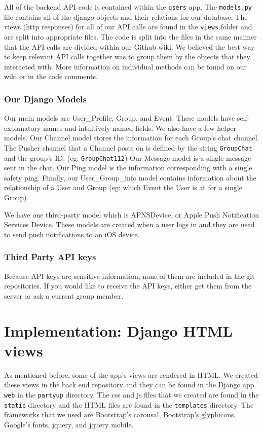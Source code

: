 \documentclass[12pt]{article}
\begin{document}
All of the backend API code is contained within the \texttt{users} app.
The \texttt{models.py} file contains all of the django objects and their relations for our database. 
The views (http responses) for all of our API calls are found in the \texttt{views} folder and are split into appropriate files.
The code is split into the files in the same manner that the API calls are divided within our Github wiki. 
We believed the best way to keep relevant API calls together was to group them by the objects that they interacted with. 
More information on individual methods can be found on our wiki or in the code comments.

\subsubsection{Our Django Models}

Our main models are User\_Profile, Group, and Event. 
These models have self-explanatory names and intuitively named fields. 
We also have a few helper models. 
Our Channel model stores the information for each Group's chat channel. 
The Pusher channel that a Channel posts on is defined by the string \texttt{GroupChat} and the group's ID. (eg: \texttt{GroupChat112}) 
Our Message model is a single message sent in the chat. 
Our Ping model is the information corresponding with a single safety ping. 
Finally, our User\_Group\_info model contains information about the relationship of a User and Group (eg: which Event the User is at for a single Group).

We have one third-party model which is APNSDevice, or Apple Push Notification Services Device. 
These models are created when a user logs in and they are used to send push notifications to an iOS device.

\subsubsection{Third Party API keys}

Because API keys are sensitive information, none of them are included in the git repositories. 
If you would like to receive the API keys, either get them from the server or ask a current group member.

\section{Implementation: Django HTML views}

As mentioned before, some of the app's views are rendered in HTML. We created these views in the back end repository and they can be found in the Django app \texttt{web} in the \texttt{partyup} directory. The css and js files that we created are found in the  \texttt{static} directory and the HTML files are found in the  \texttt{templates} directory. The frameworks that we used are Bootstrap's carousal, Bootstrap's glyphicons, Google's fonts, jquery, and jquery mobile. 
\end{document}

